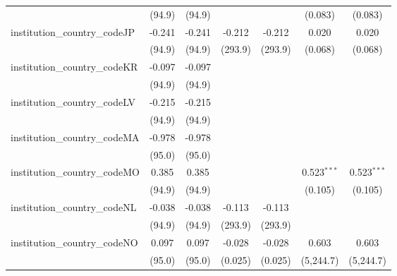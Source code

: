 \begin{tabular}{lcccccc}
                                         & (94.9)        & (94.9)        &               &               & (0.083)       & (0.083)\\   
   institution\_country\_codeJP          & -0.241        & -0.241        & -0.212        & -0.212        & 0.020         & 0.020\\   
                                         & (94.9)        & (94.9)        & (293.9)       & (293.9)       & (0.068)       & (0.068)\\   
   institution\_country\_codeKR          & -0.097        & -0.097        &               &               &               &   \\   
                                         & (94.9)        & (94.9)        &               &               &               &   \\   
   institution\_country\_codeLV          & -0.215        & -0.215        &               &               &               &   \\   
                                         & (94.9)        & (94.9)        &               &               &               &   \\   
   institution\_country\_codeMA          & -0.978        & -0.978        &               &               &               &   \\   
                                         & (95.0)        & (95.0)        &               &               &               &   \\   
   institution\_country\_codeMO          & 0.385         & 0.385         &               &               & 0.523$^{***}$ & 0.523$^{***}$\\   
                                         & (94.9)        & (94.9)        &               &               & (0.105)       & (0.105)\\   
   institution\_country\_codeNL          & -0.038        & -0.038        & -0.113        & -0.113        &               &   \\   
                                         & (94.9)        & (94.9)        & (293.9)       & (293.9)       &               &   \\   
   institution\_country\_codeNO          & 0.097         & 0.097         & -0.028        & -0.028        & 0.603         & 0.603\\   
                                         & (95.0)        & (95.0)        & (0.025)       & (0.025)       & (5,244.7)     & (5,244.7)\\   

\end{tabular}
